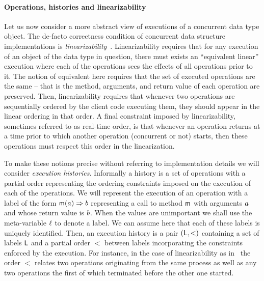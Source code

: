 
\paragraph{Operations, histories and linearizability}
Let us now consider a more abstract view of executions of a concurrent
data type object.
%
The de-facto correctness condition of concurrent data structure
implementations is \emph{linearizability}~\cite{HerlihyW90}.
%
Linearizability requires that for any execution of an object of the
data type in question, there must exists an ``equivalent linear''
execution where each of the operations sees the effects of all
operations prior to it.
%
The notion of equivalent here requires that the set of executed
operations are the same -- that is the method, arguments, and return
value of each operation are preserved.
%
Then, linearizability requires that whenever two operations are
sequentially ordered by the client code executing them, they should
appear in the linear ordering in that order.
%
A final constraint imposed by linearizability, sometimes referred to
as real-time order, is that whenever an operation returns at a time
prior to which another operation (concurrent or not) starts, then
these operations must respect this order in the linearization.
%

To make these notions precise without referring to implementation
details we will consider \emph{execution histories}.
%
Informally a history is a set of operations with a partial order
representing the ordering constraints imposed on the execution of each
of the operations.
%
We will represent the execution of an operation with a label of the
form $\mathsf{m}(a) \Rightarrow b$ representing a call to method
$\mathsf{m}$ with arguments $a$ and whose return value is $b$.
%
When the values are unimportant we shall use the meta-variable
$\ell$ to denote a label.
%
We can assume here that each of these labels is uniquely identified.
%
Then, an execution history is a pair $(\mathsf{L}, <)$ containing a
set of labels $\mathsf{L}$ and a partial order $<$ between labels
incorporating the constraints enforced by the execution.
%
For instance, in the case of linearizability as in~\cite{HerlihyW90}
the order $<$ relates two operations originating from the same process
as well as any two operations the first of which terminated before the
other one started.

